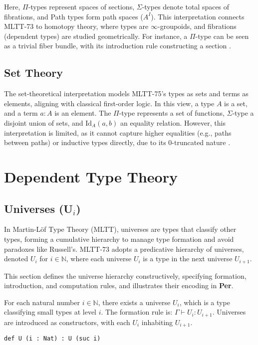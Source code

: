 \documentclass{article}
\begin{document}
Here, $\Pi$-types represent spaces of sections, $\Sigma$-types denote
total spaces of fibrations, and Path types form path spaces ($A^I$).
This interpretation connects MLTT-73 to homotopy theory, where types
are $\infty$-groupoids, and fibrations (dependent types) are studied
geometrically. For instance, a $\Pi$-type can be seen as a trivial fiber
bundle, with its introduction rule constructing a section \cite{HoTT13}.

\subsection*{Set Theory}

The set-theoretical interpretation models MLTT-75’s types as sets and
terms as elements, aligning with classical first-order logic. In this
view, a type $A$ is a set, and a term $a : A$ is an element. The $\Pi$-type
represents a set of functions, $\Sigma$-type a disjoint union of sets,
and $\text{Id}_A(a, b)$ an equality relation. However, this interpretation
is limited, as it cannot capture higher equalities (e.g., paths between paths)
or inductive types directly, due to its 0-truncated nature \cite{HoTT13}.

\section{Dependent Type Theory}

\subsection{Universes (U$_i$)}
In Martin-Löf Type Theory (MLTT), universes are types that classify other types,
forming a cumulative hierarchy to manage type formation and avoid paradoxes like
Russell’s. MLTT-73 adopts a predicative hierarchy
of universes, denoted \( U_i \) for \( i \in \mathbb{N} \), where each
universe \( U_i \) is a type in the next universe \( U_{i+1} \).

This section defines the universe hierarchy constructively,
specifying formation, introduction, and computation rules,
and illustrates their encoding in \textbf{Per}.

\begin{definition}
For each natural number \( i \in \mathbb{N} \), there exists a universe \( U_i \), which is a type classifying small types at level \( i \). The formation rule is:
$\Gamma \vdash U_i : U_{i+1}$.
Universes are introduced as constructors, with each \( U_i \) inhabiting \( U_{i+1} \).
\begin{lstlisting}[mathescape=true]
def U (i : Nat) : U (suc i)
\end{lstlisting}
\end{definition}
\end{document}
